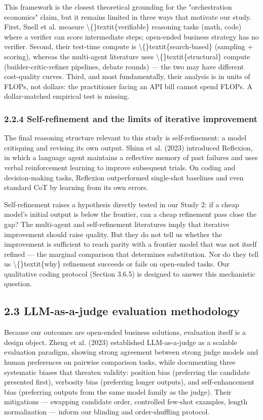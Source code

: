 \documentclass[11pt,a4paper]{article}
\begin{document}
This framework is the closest theoretical grounding for the "orchestration
economics" claim, but it remains limited in three ways that motivate our
study. First, Snell et al. measure \textbackslash\{\}textit\{verifiable\} reasoning tasks (math,
code) where a verifier can score intermediate steps; open-ended business
strategy has no verifier. Second, their test-time compute is
\textbackslash\{\}textit\{search-based\} (sampling + scoring), whereas the multi-agent literature
uses \textbackslash\{\}textit\{structural\} compute (builder-critic-refiner pipelines, debate rounds)
— the two may have different cost-quality curves. Third, and most
fundamentally, their analysis is in units of FLOPs, not dollars: the
practitioner facing an API bill cannot spend FLOPs. A dollar-matched
empirical test is missing.

\subsubsection{2.2.4 Self-refinement and the limits of iterative improvement}

The final reasoning structure relevant to this study is self-refinement:
a model critiquing and revising its own output. Shinn et al. (2023)
introduced Reflexion, in which a language agent maintains a reflective
memory of past failures and uses verbal reinforcement learning to improve
subsequent trials. On coding and decision-making tasks, Reflexion
outperformed single-shot baselines and even standard CoT by learning from
its own errors.

Self-refinement raises a hypothesis directly tested in our Study 2: if a
cheap model's initial output is below the frontier, can a cheap refinement
pass close the gap? The multi-agent and self-refinement literatures imply
that iterative improvement should raise quality. But they do not tell us
whether the improvement is sufficient to reach parity with a frontier model
that was not itself refined — the marginal comparison that determines
substitution. Nor do they tell us \textbackslash\{\}textit\{why\} refinement succeeds or fails on
open-ended tasks. Our qualitative coding protocol (Section 3.6.5) is
designed to answer this mechanistic question.

\subsection{2.3 LLM-as-a-judge evaluation methodology}

Because our outcomes are open-ended business solutions, evaluation itself is
a design object. Zheng et al. (2023) established LLM-as-a-judge as a
scalable evaluation paradigm, showing strong agreement between strong judge
models and human preferences on pairwise comparison tasks, while documenting
three systematic biases that threaten validity: position bias (preferring
the candidate presented first), verbosity bias (preferring longer outputs),
and self-enhancement bias (preferring outputs from the same model family as
the judge). Their mitigations — swapping candidate order, controlled
few-shot examples, length normalization — inform our blinding and
order-shuffling protocol.
\end{document}
